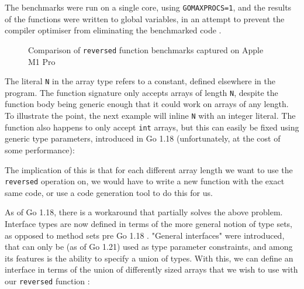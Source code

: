 The benchmarks were run on a single core, using \texttt{GOMAXPROCS=1}, and the
results of the functions were written to global variables, in an attempt to
prevent the compiler optimiser from eliminating the benchmarked code
\autocite{benchPits}.

\begin{figure}
	
	\caption{Comparison of \texttt{reversed} function benchmarks captured on
		Apple M1 Pro}
\end{figure}

The literal \texttt{N} in the array type refers to a constant, defined elsewhere
in the program. The function signature only accepts arrays of length \texttt{N},
despite the function body being generic enough that it could work on arrays of
any length. To illustrate the point, the next example will inline \texttt{N}
with an integer literal. The function also happens to only accept \texttt{int}
arrays, but this can easily be fixed using generic type parameters, introduced
in Go 1.18 (unfortunately, at the cost of some performance):




The implication of this is that for each different array length we want
to use the \texttt{reversed} operation on, we would have to write a new function
with the exact same code, or use a code generation tool to do this for us.

As of Go 1.18, there is a workaround that partially solves the above problem.
Interface types are now defined in terms of the more general notion of type
sets, as opposed to method sets pre Go 1.18 \autocites{spec}{specPre1.18}.
"General interfaces" were introduced, that can only be (as of Go 1.21) used as
type parameter constraints, and among its features is the ability to specify a
union of types. With this, we can define an interface in terms of the union of
differently sized arrays that we wish to use with our \texttt{reversed} function
\autocite{goArrayProposal}:

